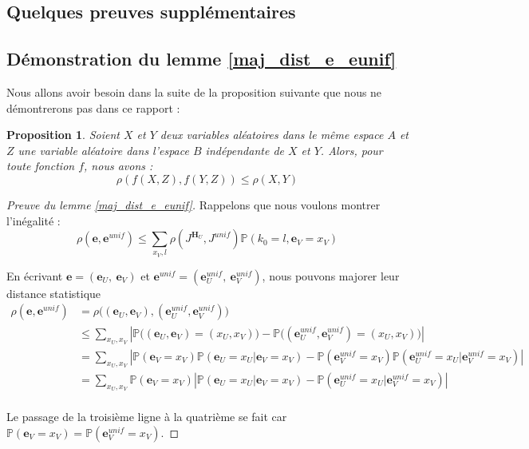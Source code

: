 \documentclass[12pt]{article}
\theoremstyle{plain}
\newtheorem{propo}[thm]{Proposition}
\theoremstyle{definition}
\newcommand{\e}{\mathbf{e}}
\begin{document}
\begin{appendix}
\section*{Quelques preuves supplémentaires}

\subsection*{Démonstration du lemme \ref{maj_dist_e_eunif}}

Nous allons avoir besoin dans la suite de la proposition suivante que nous ne démontrerons pas dans ce rapport :
\begin{propo}\label{rho_f}
Soient $X$ et $Y$ deux variables aléatoires dans le même espace $A$ et $Z$ une variable aléatoire dans l'espace $B$ indépendante de $X$ et $Y$. Alors, pour toute fonction $f$, nous avons : $$ \rho(f(X,Z),f(Y,Z)) \leq \rho(X,Y)$$
\end{propo}

\begin{proof}[Preuve du lemme \ref{maj_dist_e_eunif}]
Rappelons que nous voulons montrer l’inégalité :
$$ \rho\left(\e ,\e^{unif}\right) \leq \sum\limits_{x_V,l} \rho\left(J^{\mathbf{H}_U},J^{unif}\right)\mathbb{P}\left(k_0 = l, \e_V = x_V\right) $$ 

\noindent En écrivant $\e = (\e_U,\ \e_V)$ et $\e^{unif} = (\e_U^{unif},\ \e_V^{unif})$, nous pouvons majorer leur distance statistique
{\scriptsize
\begin{equation*}
\begin{split}
\rho(\e,\e^{unif}) &= \rho\Big((\e_U,\e_V),(\e_U^{unif},\e_V^{unif})\Big)\\
&\leq \sum\limits_{x_U,x_V} \left|\mathbb{P}\Big((\e_U,\e_V)=(x_U,x_V)\Big) - \mathbb{P}\Big((\e_U^{unif},\e_V^{unif})=(x_U,x_V)\Big)\right|\\
&= \sum\limits_{x_U,x_V} \left|\mathbb{P}(\e_V = x_V)\mathbb{P}(\e_U=x_U|\e_V=x_V) - \mathbb{P}(\e_V^{unif} = x_V)\mathbb{P}(\e_U^{unif}=x_U | \e_V^{unif}=x_V)\right|\\
&= \sum\limits_{x_U,x_V} \mathbb{P}(\e_V = x_V)\left|\mathbb{P}(\e_U=x_U|\e_V=x_V) - \mathbb{P}(\e_U^{unif}=x_U | \e_V^{unif}=x_V)\right|\\
\end{split}
\end{equation*}}

\noindent Le passage de la troisième ligne à la quatrième se fait car $\mathbb{P}(\e_V = x_V) = \mathbb{P}(\e_V^{unif} = x_V) $.


\end{proof}
\end{appendix}
\end{document}

